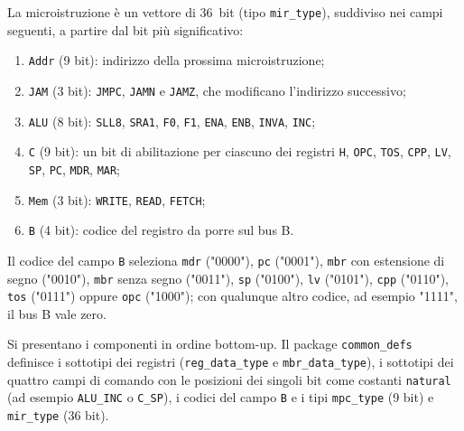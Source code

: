 La microistruzione è un vettore di \SI{36}{bit} (tipo \texttt{mir\_type}), suddiviso nei campi seguenti, a partire dal bit più significativo:
\begin{enumerate}
  \item \texttt{Addr} (9 bit): indirizzo della prossima microistruzione;
  \item \texttt{JAM} (3 bit): \texttt{JMPC}, \texttt{JAMN} e \texttt{JAMZ}, che modificano l'indirizzo successivo;
  \item \texttt{ALU} (8 bit): \texttt{SLL8}, \texttt{SRA1}, \texttt{F0}, \texttt{F1}, \texttt{ENA}, \texttt{ENB}, \texttt{INVA}, \texttt{INC};
  \item \texttt{C} (9 bit): un bit di abilitazione per ciascuno dei registri \texttt{H}, \texttt{OPC}, \texttt{TOS}, \texttt{CPP}, \texttt{LV}, \texttt{SP}, \texttt{PC}, \texttt{MDR}, \texttt{MAR};
  \item \texttt{Mem} (3 bit): \texttt{WRITE}, \texttt{READ}, \texttt{FETCH};
  \item \texttt{B} (4 bit): codice del registro da porre sul bus B.
\end{enumerate}
Il codice del campo \texttt{B} seleziona \texttt{mdr} ("0000"), \texttt{pc} ("0001"), \texttt{mbr} con estensione di segno ("0010"), \texttt{mbr} senza segno ("0011"), \texttt{sp} ("0100"), \texttt{lv} ("0101"), \texttt{cpp} ("0110"), \texttt{tos} ("0111") oppure \texttt{opc} ("1000"); con qualunque altro codice, ad esempio "1111", il bus B vale zero.

\implementazione

Si presentano i componenti in ordine bottom-up. Il package \texttt{common\_defs} definisce i sottotipi dei registri (\texttt{reg\_data\_type} e \texttt{mbr\_data\_type}), i sottotipi dei quattro campi di comando con le posizioni dei singoli bit come costanti \texttt{natural} (ad esempio \texttt{ALU\_INC} o \texttt{C\_SP}), i codici del campo \texttt{B} e i tipi \texttt{mpc\_type} (9 bit) e \texttt{mir\_type} (36 bit).


